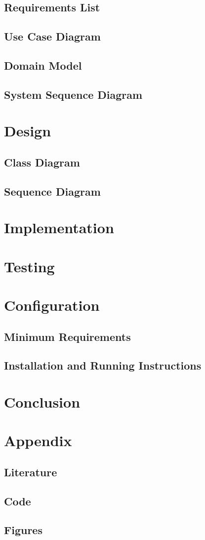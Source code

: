 \documentclass{article}
\begin{document}
\subsection{Requirements List}
\subsection{Use Case Diagram}
\subsection{Domain Model}
\subsection{System Sequence Diagram}
\section{Design}
\subsection{Class Diagram}
\subsection{Sequence Diagram}
\section{Implementation}
\section{Testing}
\section{Configuration}
\subsection{Minimum Requirements}
\subsection{Installation and Running Instructions}
\section{Conclusion}
\section{Appendix}
\subsection{Literature}
\subsection{Code}
\subsection{Figures}
\end{document}
